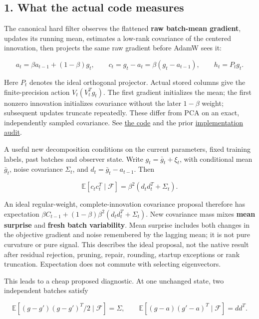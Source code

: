 \documentclass[
  british,
  10pt,
  a4paper,
]{article}
\begin{document}
\subsection{1. What the actual code
measures}\label{mathematics--what-the-actual-code-measures}

The canonical hard filter observes the flattened \textbf{raw batch-mean
gradient}, updates its running mean, estimates a low-rank covariance of
the centered innovation,\allowbreak{} then projects the same raw
gradient before AdamW sees it:

\[
a_t=\beta a_{t-1}+(1-\beta)g_t,\qquad
c_t=g_t-a_t=\beta(g_t-a_{t-1}),\qquad h_t=P_tg_t.
\]

Here \(P_t\) denotes the ideal orthogonal projector. Actual stored
columns give the finite-\allowbreak{}precision action \(V_t(V_t^Tg_t)\).
The first gradient initializes the mean; the first nonzero innovation
initializes covariance without the later \(1-\beta\) weight; subsequent
updates truncate repeatedly.\allowbreak{} These differ from PCA on an
exact, independently sampled covariance.\allowbreak{} See
\href{../../../spectral_filter.py}{the code} and the prior
\href{../analysis/mathematical-audit.md}{implementation audit}.

A useful new decomposition conditions on the current
parameters,\allowbreak{} fixed training labels, past batches and
observer state. Write \(g_t=\bar g_t+\xi_t\), with conditional mean
\(\bar g_t\), noise covariance \(\Sigma_t\), and
\(d_t=\bar g_t-a_{t-1}\). Then

\[
\mathbb E[c_tc_t^T\mid\mathcal F]=\beta^2(d_td_t^T+\Sigma_t).
\]

An ideal regular-\allowbreak{}weight,\allowbreak{}
complete-\allowbreak{}innovation covariance proposal therefore has
expectation \(\beta C_{t-1}+(1-\beta)\beta^2(d_td_t^T+\Sigma_t)\). New
covariance mass mixes \textbf{mean surprise} and \textbf{fresh batch
variability}. Mean surprise includes both changes in the objective
gradient and noise remembered by the lagging mean; it is not pure
curvature or pure signal. This describes the ideal proposal, not the
native result after residual rejection, pruning, repair, rounding,
startup exceptions or rank truncation.\allowbreak{} Expectation does not
commute with selecting eigenvectors\allowbreak{}.\allowbreak{}

This leads to a cheap proposed diagnostic.\allowbreak{} At one unchanged
state, two independent batches satisfy

\[
\mathbb E[(g-g')(g-g')^T/2\mid\mathcal F]=\Sigma,\qquad
\mathbb E[(g-a)(g'-a)^T\mid\mathcal F]=dd^T.
\]
\end{document}
